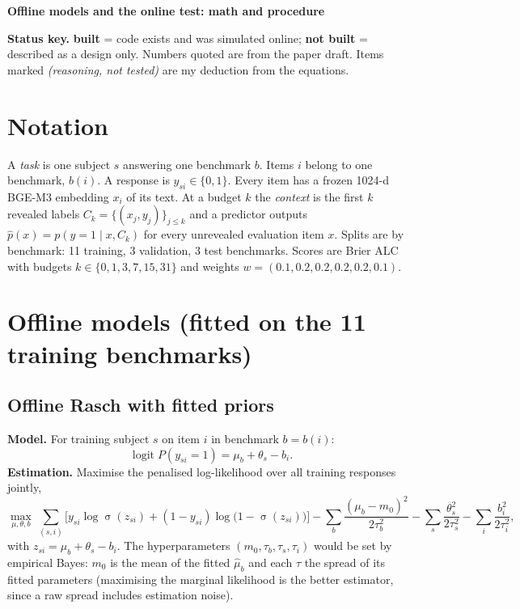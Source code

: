 \documentclass[10pt]{article}
\newcommand{\reasoning}{\textcolor{red!60!black}{\emph{(reasoning, not tested)}}}
\newcommand{\sig}{\operatorname{\sigma}}
\newcommand{\logit}{\operatorname{logit}}
\begin{document}
{\Large\bfseries Offline models and the online test: math and procedure}

\textbf{Status key.} \textbf{built} = code exists and was simulated online; \textbf{not built} = described as a design only. Numbers quoted are from the paper draft. Items marked \reasoning{} are my deduction from the equations.

\section{Notation}
A \emph{task} is one subject $s$ answering one benchmark $b$. Items $i$ belong to one benchmark, $b(i)$. A response is $y_{si}\in\{0,1\}$. Every item has a frozen 1024-d BGE-M3 embedding $x_i$ of its text. At a budget $k$ the \emph{context} is the first $k$ revealed labels $C_k=\{(x_{j},y_{j})\}_{j\le k}$ and a predictor outputs $\hat p(x)=p(y=1\mid x,C_k)$ for every unrevealed evaluation item $x$. Splits are by benchmark: 11 training, 3 validation, 3 test benchmarks. Scores are Brier ALC with budgets $k\in\{0,1,3,7,15,31\}$ and weights $w=(0.1,0.2,0.2,0.2,0.2,0.1)$.

\section{Offline models (fitted on the 11 training benchmarks)}

\subsection{Offline Rasch with fitted priors }
\textbf{Model.} For training subject $s$ on item $i$ in benchmark $b=b(i)$:
\begin{equation}
\logit P(y_{si}=1)=\mu_b+\theta_s-b_i .
\end{equation}
\textbf{Estimation.} Maximise the penalised log-likelihood over all training responses jointly,
\begin{equation}
\max_{\mu,\theta,b}\ \sum_{(s,i)}\Big[y_{si}\log\sig(z_{si})+(1-y_{si})\log\big(1-\sig(z_{si})\big)\Big]
-\sum_b\frac{(\mu_b-m_0)^2}{2\tau_b^2}-\sum_s\frac{\theta_s^2}{2\tau_s^2}-\sum_i\frac{b_i^2}{2\tau_i^2},
\end{equation}
with $z_{si}=\mu_b+\theta_s-b_i$. The hyperparameters $(m_0,\tau_b,\tau_s,\tau_i)$ would be set by empirical Bayes: $m_0$ is the mean of the fitted $\hat\mu_b$ and each $\tau$ the spread of its fitted parameters (maximising the marginal likelihood is the better estimator, since a raw spread includes estimation noise).
\end{document}

